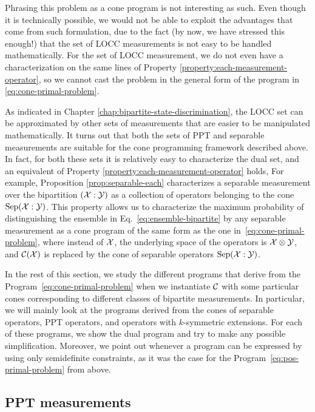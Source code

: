 Phrasing this problem as a cone program is not interesting as such. Even though it is
technically possible, we would not be able to exploit the advantages that come from such formulation, 
due to the fact (by now, we have stressed this enough!) that the set of LOCC measurements 
is not easy to be handled mathematically.
For the set of LOCC measurement, we do not even have a characterization
on the same lines of Property \ref{property:each-measurement-operator}, so we cannot cast
the problem in the general form of the program in \eqref{eq:cone-primal-problem}. 

As indicated in Chapter \ref{chap:bipartite-state-discrimination}, the LOCC set
can be approximated by other sets of measurements that are easier to be manipulated 
mathematically. It turns out that both the sets of PPT and separable measurements are
suitable for the cone programming framework described above. In fact, for both 
these sets it is relatively easy to characterize the dual set, and an equivalent 
of Property \ref{property:each-measurement-operator} holds,
For example, Proposition \ref{prop:separable-each} characterizes a separable 
measurement over the bipartition $(\mathcal{X}:\mathcal{Y})$ as a collection of operators 
belonging to the cone $\mathrm{Sep}(\mathcal{X}:\mathcal{Y})$.
This property allows us to characterize the maximum probability of 
distinguishing the ensemble in Eq.~\eqref{eq:ensemble-bipartite} by any 
separable measurement as a cone program of the same form as the one 
in~\eqref{eq:cone-primal-problem}, where instead of $\mathcal{X}$, the underlying space 
of the operators is $\mathcal{X}\otimes\mathcal{Y}$, and $\mathcal{C}(\mathcal{X})$ is replaced by the cone of 
separable operators $\mathrm{Sep}(\mathcal{X}:\mathcal{Y})$.

In the rest of this section, we study the different programs that derive 
from the Program~\eqref{eq:cone-primal-problem} when we instantiate $\mathcal{C}$ with
some particular cones corresponding to different classes of bipartite 
measurements. In particular, we will mainly look at the programs derived from the cones
of separable operators, PPT operators, and operators with $k$-symmetric extensions.
For each of these programs, we show the dual program and try to make any possible
simplification. Moreover, we point out whenever a program can be 
expressed by using only semidefinite constraints, as it was the case for the 
Program~\eqref{eq:pos-primal-problem} from above.

\subsection{PPT measurements}

